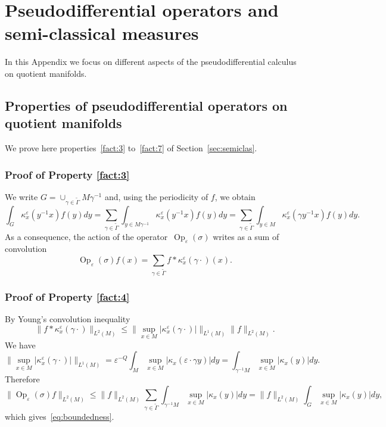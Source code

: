 \documentclass[10pt]{amsart}
\DeclareMathOperator{\Op}{Op}
\theoremstyle{plain}
\theoremstyle{definition}
\let\eps\varepsilon
\let\Subsection\subsection\let\Subsubsection\subsubsection
\begin{document}
\section{Pseudodifferential operators and semi-classical measures}\label{sec:proofpseudo}

In this Appendix we focus on different aspects of the pseudodifferential calculus on quotient manifolds.

\Subsection{Properties of pseudodifferential operators on quotient manifolds}

We prove here properties~\eqref{fact:3} to~\eqref{fact:7} of Section~\ref{sec:semiclas}.

\subsubsection*{Proof of Property \eqref{fact:3}}
We write
$G=\cup_{\gamma \in \widetilde{\Gamma}} M \gamma^{-1}$
and, using the periodicity of $f$, we obtain
\[
\int_{ G} \kappa_{ x}^\eps(y^{-1} x) f(y)dy=\sum_{\gamma\in \widetilde{\Gamma}} \int _{y\in M \gamma^{-1}} \kappa_{ x}^\eps(y^{-1} x) f(y)dy= \sum_{\gamma\in \widetilde{\Gamma}} \int _{y\in M } \kappa_{ x}^\eps(\gamma y^{-1} x) f(y)dy.
\]
As a consequence, the action of the operator~$\Op_\eps(\sigma)$ writes as a sum of convolution
\[
\Op_\eps(\sigma)f(x) = \sum_{\gamma\in \widetilde{\Gamma}} f*\kappa^\eps_{x}(\gamma\cdot) (x).
\]

\subsubsection*{Proof of Property \eqref{fact:4}}
By Young's convolution inequality
\[
\| f* \kappa^\eps_{x}(\gamma\cdot) \|_{L^2(M)}\leq \| \sup_{x\in M}| \kappa^\eps_{x}(\gamma\cdot) | \|_{L^1(M)} \| f\|_{L^2(M)}.
\]
We have
\[
\| \sup_{x\in M} | \kappa^\eps_{x}(\gamma\cdot)| \|_{L^1(M)}= \eps^{-Q}\int_M \sup_{x\in M} | \kappa_{x}(\eps\cdot \gamma y) |dy =\int_{\gamma^{-1}M}\sup_{x\in M} |\kappa_x(y)|dy.
\]
Therefore
\[
\| \Op_\eps(\sigma)f\|_{L^2(M)} \leq \| f\|_{L^2(M)} \sum_{\gamma\in \widetilde{\Gamma}} \int_{\gamma^{-1}M}\sup_{x\in M} |\kappa_x(y)|dy= \|f\|_{L^2(M)}\int_{G} \sup_{x\in M} |\kappa_x(y)|dy,
\]
which gives~\eqref{eq:boundedness}.
\end{document}
